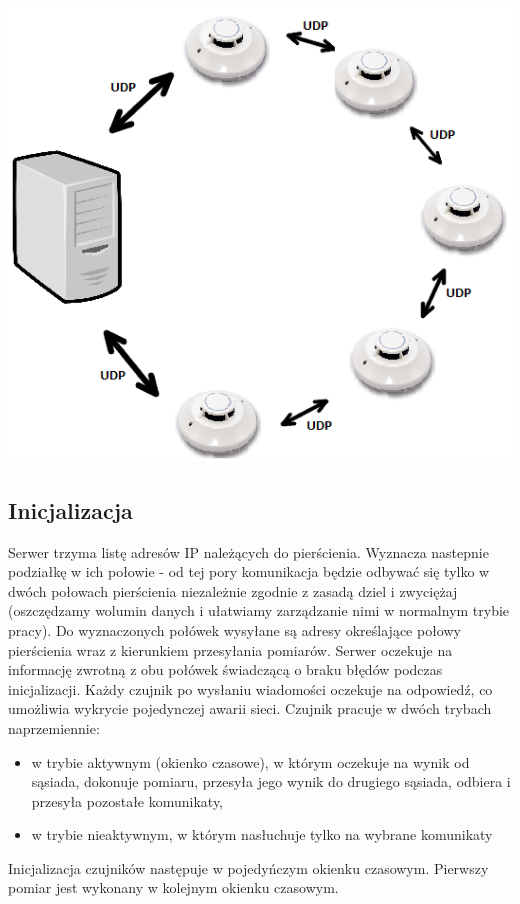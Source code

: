 \documentclass[a4paper,11pt]{article}
\begin{document}
\begin{center}
\includegraphics[scale=0.5]{architektura}
\end{center}

\subsection{Inicjalizacja}
Serwer trzyma listę adresów IP należących do pierścienia. Wyznacza nastepnie podziałkę w ich połowie - od tej pory komunikacja będzie odbywać się tylko w dwóch połowach pierścienia niezależnie zgodnie z zasadą dziel i zwyciężaj (oszczędzamy wolumin danych i ułatwiamy zarządzanie nimi w normalnym trybie pracy).
Do wyznaczonych połówek wysyłane są adresy określające połowy pierścienia wraz z kierunkiem przesyłania pomiarów. Serwer oczekuje na informację zwrotną z obu połówek świadczącą o braku błędów podczas inicjalizacji. Każdy czujnik po wysłaniu wiadomości oczekuje na odpowiedź, co umożliwia wykrycie pojedynczej awarii sieci.
\newpage
Czujnik pracuje w dwóch trybach naprzemiennie:
\begin{itemize}
\item w trybie aktywnym (okienko czasowe), w którym oczekuje na wynik od sąsiada, dokonuje pomiaru, przesyła jego wynik do drugiego sąsiada, odbiera i przesyła pozostałe komunikaty,
\item w trybie nieaktywnym, w którym nasłuchuje tylko na wybrane komunikaty
\end{itemize}
Inicjalizacja czujników następuje w pojedyńczym okienku czasowym. Pierwszy pomiar jest wykonany w kolejnym okienku czasowym. 
\end{document}
